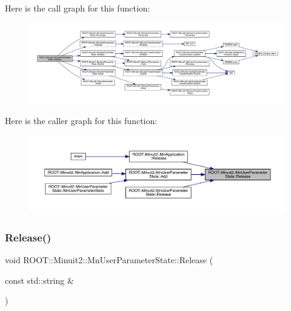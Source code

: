 Here is the call graph for this function\+:\nopagebreak
\begin{figure}[H]
\begin{center}
\leavevmode
\includegraphics[width=350pt]{d3/de0/classROOT_1_1Minuit2_1_1MnUserParameterState_a7dd23afe69aaab961b536e2cdc75d66e_cgraph}
\end{center}
\end{figure}
Here is the caller graph for this function\+:\nopagebreak
\begin{figure}[H]
\begin{center}
\leavevmode
\includegraphics[width=350pt]{d3/de0/classROOT_1_1Minuit2_1_1MnUserParameterState_a7dd23afe69aaab961b536e2cdc75d66e_icgraph}
\end{center}
\end{figure}
\mbox{\label{classROOT_1_1Minuit2_1_1MnUserParameterState_ae35c9bfa1e967c16542143a99a6f03eb}} 
\subsubsection{\texorpdfstring{Release()}{Release()}\hspace{0.1cm}{\footnotesize\ttfamily [3/4]}}
{\footnotesize\ttfamily void R\+O\+O\+T\+::\+Minuit2\+::\+Mn\+User\+Parameter\+State\+::\+Release (\begin{DoxyParamCaption}\item[{const std\+::string \&}]{ }\end{DoxyParamCaption})}

